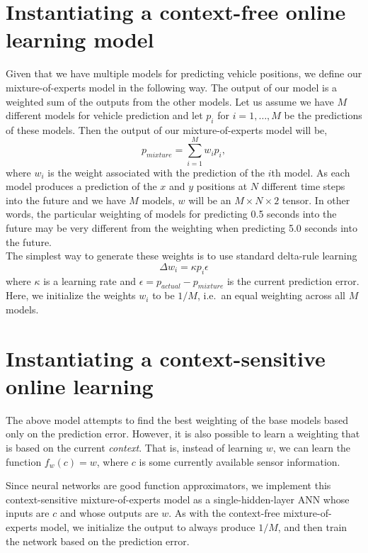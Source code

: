 \section{Instantiating a context-free online learning model}
\label{sec:context_free_online}

Given that we have multiple models for predicting vehicle positions, we define our mixture-of-experts model in the following way.
The output of our model is a weighted sum of the outputs from the other  models.
Let us assume we have $M$ different models for vehicle prediction and let $p_i$ for $i=1, \ldots, M$ be the predictions of these models.
Then the output of our mixture-of-experts model will be,
\begin{equation}
    p_{mixture} = \sum_{i=1}^{M} w_i p_i,
    \label{eq:mixture_of_experts}
\end{equation}
where $w_i$ is the weight associated with the prediction of the $i$th model.
As each model produces a prediction of the $x$ and $y$ positions at $N$ different time steps into the future and we have $M$ models, $w$ will be an $M \times N \times 2$ tensor.
In other words, the particular weighting of models for predicting 0.5 seconds into the future may be very different from the weighting when predicting 5.0 seconds into the future.\\
The simplest way to generate these weights is to use standard delta-rule learning
\begin{equation}
	\label{eq:delta_rule}
    \Delta w_i = \kappa p_i \epsilon
\end{equation}
where $\kappa$ is a learning rate and $\epsilon = p_{actual} - p_{mixture}$ is the current prediction error.
Here, we initialize the weights $w_i$ to be $1/M$, i.e.\ an equal weighting across all $M$ models.

\section{Instantiating a context-sensitive online learning}
\label{sec:context_sensitive_online}
The above model attempts to find the best weighting of the base models based only on the prediction error.
However, it is also possible to learn a weighting that is based on the current \textit{context}.
That is, instead of learning $w$, we can learn the function $f_w(c)=w$, where $c$ is some currently available sensor information.

Since neural networks are good function approximators, we implement this context-sensitive mixture-of-experts model as a single-hidden-layer \ac{ANN} whose inputs are $c$ and whose outputs are $w$.
As with the context-free mixture-of-experts model, we initialize the output to always produce $1/M$, and then train the network based on the prediction error.

